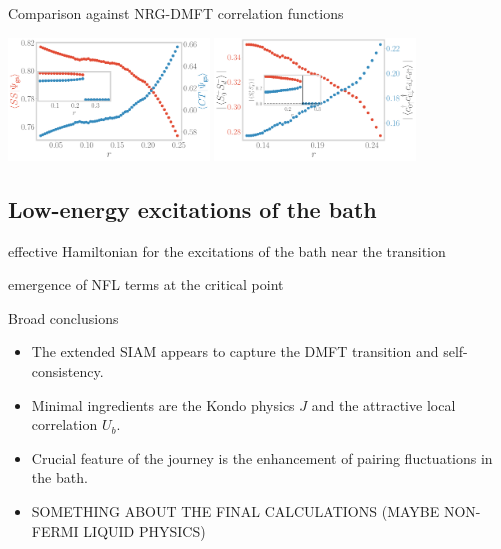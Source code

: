 \documentclass[8pt,aspectratio=169]{beamer}
\begin{document}
\begin{frame}{Comparison against NRG-DMFT correlation functions}
{\begin{itemize}
\includegraphics[width=0.4\textwidth]{corrs_gs.pdf}
\hspace*{\fill}
\includegraphics[width=0.4\textwidth]{pairing.pdf}
\end{itemize}
}
\end{frame}

\begin{frame}{}
\section{Low-energy excitations of the bath}
\end{frame}
\begin{frame}{effective Hamiltonian for the excitations of the bath near the transition}
\end{frame}
\begin{frame}{emergence of NFL terms at the critical point}
\end{frame}

\begin{frame}{Broad conclusions}
\begin{itemize}
	\item The extended SIAM appears to capture the DMFT transition and \alert{self-consistency}.\\[10pt]
	\item \alert{Minimal ingredients} are the Kondo physics \(J\) and  the attractive local correlation \(U_b\).\\[10pt]
	\item Crucial feature of the journey is the enhancement of \alert{pairing fluctuations} in the bath.\\[10pt]
	\item  SOMETHING ABOUT THE FINAL CALCULATIONS (MAYBE NON-FERMI LIQUID PHYSICS)
\end{itemize}	
\end{frame}
\end{document}

